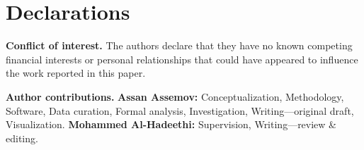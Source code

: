 \documentclass[smallextended]{svjour3}
\begin{document}
\section*{Declarations}

\textbf{Conflict of interest.} The authors declare that they have no known competing financial interests or personal relationships that could have appeared to influence the work reported in this paper.

\textbf{Author contributions.} \textbf{Assan Assemov:} Conceptualization, Methodology, Software, Data curation, Formal analysis, Investigation, Writing---original draft, Visualization. \textbf{Mohammed Al-Hadeethi:} Supervision, Writing---review \& editing.



\end{document}
